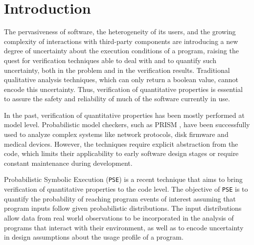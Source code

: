 \documentclass[10pt]{article}
\newcounter{list}
\begin{document}
\newcommand{\PSE}{\texttt{PSE}}
\newcommand{\qCORAL}{\texttt{qCORAL}}
\newcommand{\PC}{\textit{PC}}
\raisebox{1cm}

\vspace{-4mm}
\section{Introduction}

The pervasiveness of software, the heterogeneity of its users, and the
growing complexity of interactions with third-party components are
introducing a new degree of uncertainty about the execution conditions
of a program, raising the quest for verification techniques able to
deal with and to quantify such uncertainty, both in the problem and in
the verification results.\cite{borges2015iterative} Traditional
qualitative analysis techniques, which can only return a boolean
value, cannot encode this uncertainty.  Thus, verification of
quantitative properties is essential to assure the safety and
reliability of much of the software currently in use.

In the past, verification of quantitative properties has been mostly
performed at model level. Probabilistic model checkers, such as PRISM
\cite{kwiatkowska2011prism}, have been successfully used to analyze complex
systems like network protocols, disk firmware and medical devices.
However, the techniques require explicit abstraction from the code,
which limits their applicability to early software design stages or
require constant maintenance during development.

Probabilistic Symbolic Execution (\PSE{})
\cite{geldenhuys2012probabilistic,filieri2013reliability} is a recent
technique that aims to bring verification of quantitative properties
to the code level. The objective of \PSE{} \cite{borges2015iterative}
is to quantify the probability of reaching program events of interest
assuming that program inputs follow given probabilistic
distributions. The input distributions allow data from real world
observations to be incorporated in the analysis of programs that
interact with their environment, as well as to encode uncertainty in
design assumptions about the usage profile of a program.
\end{document}
